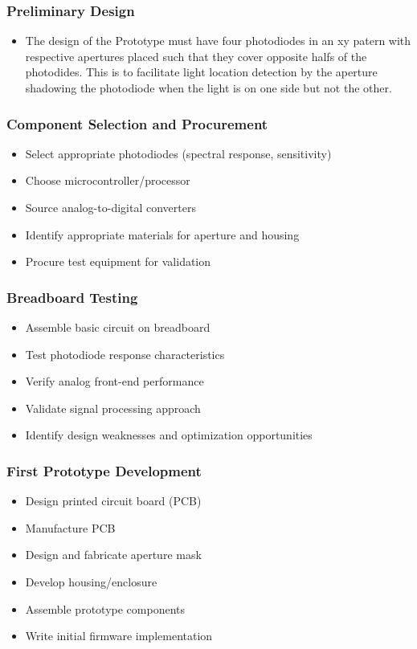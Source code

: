 \subsubsection*{Preliminary Design}
\begin{itemize}
  \item The design of the Prototype must have four photodiodes in an xy patern with respective apertures placed such that they cover opposite halfs of the photodides. This is to facilitate light location detection by the aperture shadowing the photodiode when the light is on one side but not the other.
\end{itemize}

\subsubsection*{Component Selection and Procurement}
\begin{itemize}
  \item Select appropriate photodiodes (spectral response, sensitivity)
  \item Choose microcontroller/processor
  \item Source analog-to-digital converters
  \item Identify appropriate materials for aperture and housing
  \item Procure test equipment for validation
\end{itemize}

\subsubsection*{Breadboard Testing}
\begin{itemize}
  \item Assemble basic circuit on breadboard
  \item Test photodiode response characteristics
  \item Verify analog front-end performance
  \item Validate signal processing approach
  \item Identify design weaknesses and optimization opportunities
\end{itemize}

\subsubsection*{First Prototype Development}
\begin{itemize}
  \item Design printed circuit board (PCB)
  \item Manufacture PCB
  \item Design and fabricate aperture mask
  \item Develop housing/enclosure
  \item Assemble prototype components
  \item Write initial firmware implementation
\end{itemize}

